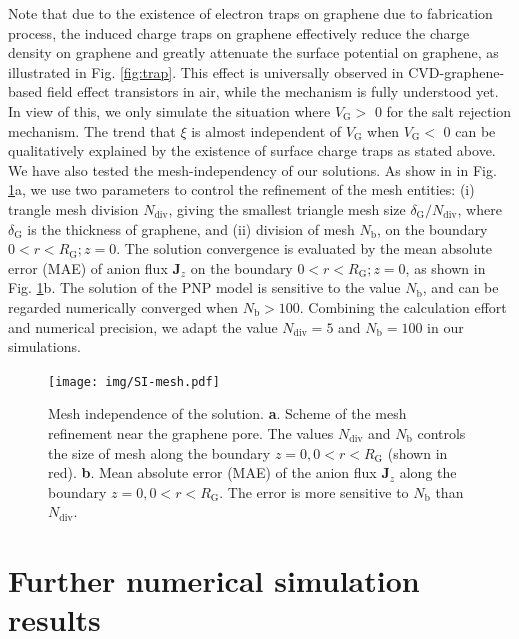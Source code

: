 \documentclass[manuscript=suppinfo,email=true, hyperref=true, keywords=false]{achemso}
\newcommand{\Fig}{Fig.}
\begin{document}
Note that due to the existence of electron traps on graphene due to
fabrication process, the induced charge traps on graphene effectively
reduce the charge density on graphene and greatly attenuate the
surface potential on graphene, as illustrated in \Fig
\ref{fig:trap}. This effect is universally observed in
CVD-graphene-based field effect transistors in air, while the
mechanism is fully understood yet. In view of this, we only simulate
the situation where $V_{\mathrm{G}}>$ 0 for the salt rejection
mechanism. The trend that $\xi$ is almost independent of
$V_{\mathrm{G}}$ when $V_{\mathrm{G}}<$ 0 can be qualitatively
explained by the existence of surface charge traps as stated above.
We have also tested the mesh-independency of our solutions. As show in
in \Fig{} \ref{fig:mesh}a, we use two parameters to control the
refinement of the mesh entities: (i) trangle mesh division
$N_{\mathrm{div}}$, giving the smallest triangle mesh size
$\delta_{\mathrm{G}} / N_{\mathrm{div}}$, where $\delta_{\mathrm{G}}$
is the thickness of graphene, and (ii) division of mesh
$N_{\mathrm{b}}$, on the boundary $0<r<R_{\mathrm{G}};z=0$. The
solution convergence is evaluated by the mean absolute error (MAE) of
anion flux $\boldsymbol{J}_{z}$ on the boundary
$0<r<R_{\mathrm{G}};z=0$, as shown in \Fig{}
\ref{fig:mesh}b. The solution of the PNP model is sensitive to the
value $N_{\mathrm{b}}$, and can be regarded numerically converged when
$N_{\mathrm{b}}>100$. Combining the calculation effort and numerical
precision, we adapt the value $N_{\mathrm{div}}=5$ and
$N_{\mathrm{b}}=100$ in our simulations.

\begin{figure}[htbp]
  \centering
  \texttt{[image: img/SI-mesh.pdf]}
  \caption{Mesh independence of the solution. \textbf{a}. Scheme of
    the mesh refinement near the graphene pore. The values
    $N_{\mathrm{div}}$ and $N_{\mathrm{b}}$ controls the size of mesh
    along the boundary $z=0, 0<r<R_{\mathrm{G}}$ (shown in
    red). \textbf{b}. Mean absolute error (MAE) of the anion flux
    $\boldsymbol{J}_{z}$ along the boundary $z=0,
    0<r<R_{\mathrm{G}}$. The error is more sensitive to
    $N_{\mathrm{b}}$ than $N_{\mathrm{div}}$.}
  \label{fig:mesh}
\end{figure}

\section{Further numerical simulation results}
\label{sec:simu-res}
\end{document}
